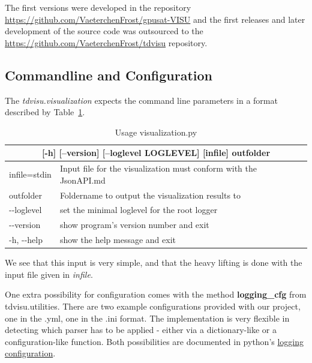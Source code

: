 \documentclass[a4paper, 12pt, bibliography=totoc]{scrartcl}
\begin{document}
The first versions were developed in the repository \url{https://github.com/VaeterchenFrost/gpusat-VISU} and the first releases and later development of the source code was outsourced to the \url{https://github.com/VaeterchenFrost/tdvisu} repository.


\subsection{Commandline and Configuration}

The \textit{tdvisu.visualization} expects the command line parameters in a format described by Table~\ref{tab:optionstdvisu}.

\def\arraystretch{1.2}%
\begin{longtable}{|ll|}
	\caption{Usage visualization.py 
		\label{tab:optionstdvisu}}\\
	\hline 
	\multicolumn{2}{|c|}{[-h] [--version] [--loglevel LOGLEVEL] [infile] outfolder}
	\\[2ex]
	\endfirsthead

	infile=stdin &  Input file for the visualization must conform with the JsonAPI.md\\
	outfolder &  Foldername to output the visualization results to\\
	-{}-loglevel  &   set the minimal loglevel for the root logger\\
	-{}-version & show program's version number and exit\\
	-h, -{}-help & show the help message and exit\\
	\hline
\end{longtable}

We see that this input is very simple, and that the heavy lifting is done with the input file given in \textit{infile}.

One extra possibility for configuration comes with the method \textbf{logging\_cfg} from {tdvisu.utilities}. There are two example configurations provided with our project, one in the .yml, one in the .ini format. The implementation is very flexible in detecting which parser has to be applied - either via a dictionary-like or a configuration-like function. Both possibilities are documented in python's \href{https://docs.python.org/3/library/logging.config.html#logging-config-api}{logging configuration}.
\end{document}
